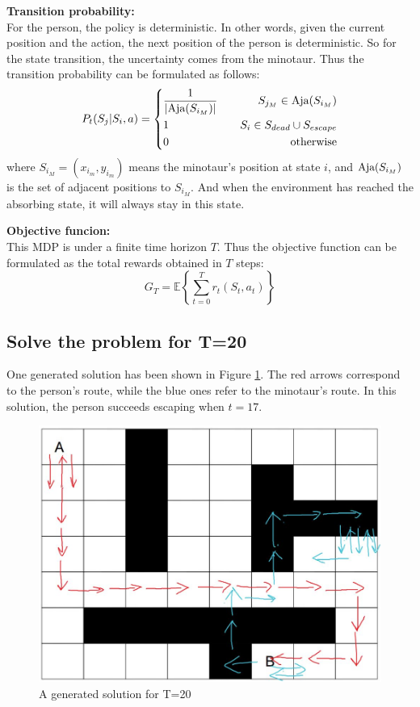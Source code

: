 \documentclass{article}
\begin{document}
\textbf{Transition probability:} \\
For the person, the policy is deterministic. In other words, given the current position and the action, the next position of the person is deterministic.
So for the state transition, the uncertainty comes from the minotaur. Thus the transition probability can be formulated as follows:
$$P_t(S_j|S_i,a)=\left\{\begin{aligned}
  &\frac{1}{|\textup{Aja}(S_{i_M})|} \quad &S_{j_M}\in \textup{Aja}(S_{i_M}) \\
  &1 \quad &S_i\in S_{dead}\cup S_{escape} \\
  &0 \quad &\textup{otherwise}
\end{aligned}\right.$$
where $S_{i_M}=(x_{i_m},y_{i_m})$ means the minotaur's position at state $i$, and $\textup{Aja}(S_{i_M})$ is the set of adjacent positions to $S_{i_M}$.
And when the environment has reached the absorbing state, it will always stay in this state.
\newline

\textbf{Objective funcion:} \\
This MDP is under a finite time horizon $T$. Thus the objective function can be formulated as the total rewards obtained in $T$ steps:
$$G_T=\mathbb{E}\left\{\sum_{t=0}^T r_t(S_t,a_t)\right\}$$

\subsection{Solve the problem for T=20}
One generated solution has been shown in Figure \ref{solution}.
The red arrows correspond to the person's route, while the blue ones refer to the minotaur's route.
In this solution, the person succeeds escaping when $t=17$.
\begin{figure}[h]
  \centering
  \includegraphics[scale=0.5]{solution.jpg}
  \caption{A generated solution for T=20}
  \label{solution}
\end{figure}
\end{document}
